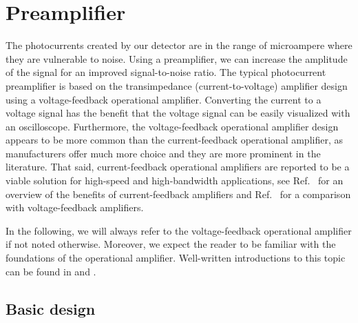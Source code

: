 \section{Preamplifier}

The photocurrents created by our detector are in the range of microampere where they are vulnerable to noise.
Using a preamplifier, we can increase the amplitude of the signal for an improved signal-to-noise ratio.
The typical photocurrent preamplifier is based on the transimpedance (current-to-voltage) amplifier design using a voltage-feedback operational amplifier.
Converting the current to a voltage signal has the benefit that the voltage signal can be easily visualized with an oscilloscope.
Furthermore, the voltage-feedback operational amplifier design appears to be more common than the current-feedback operational amplifier, as manufacturers offer much more choice and they are more prominent in the literature.
That said, current-feedback operational amplifiers are reported to be a viable solution for high-speed and high-bandwidth applications, see Ref.~\cite[p.~110]{Jung05} for an overview of the benefits of current-feedback amplifiers and Ref.~\cite[Ch.~9]{Carter17} for a comparison with voltage-feedback amplifiers.

In the following, we will always refer to the voltage-feedback operational amplifier if not noted otherwise.
Moreover, we expect the reader to be familiar with the foundations of the operational amplifier.
Well-written introductions to this topic can be found in \cite[Ch.~1]{Jung05} and \cite[Ch.~3]{Carter17}.


\subsection{Basic design}

